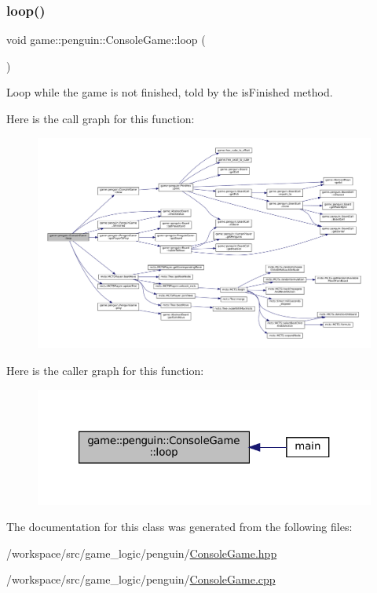 \subsubsection{\texorpdfstring{loop()}{loop()}}
{\footnotesize\ttfamily void game\+::penguin\+::\+Console\+Game\+::loop (\begin{DoxyParamCaption}{ }\end{DoxyParamCaption})}



Loop while the game is not finished, told by the {\ttfamily is\+Finished} method. 

Here is the call graph for this function\+:
\nopagebreak
\begin{figure}[H]
\begin{center}
\leavevmode
\includegraphics[width=350pt]{classgame_1_1penguin_1_1_console_game_a56af132d8e3d16902fb46b7979d37eae_cgraph}
\end{center}
\end{figure}
Here is the caller graph for this function\+:
\nopagebreak
\begin{figure}[H]
\begin{center}
\leavevmode
\includegraphics[width=321pt]{classgame_1_1penguin_1_1_console_game_a56af132d8e3d16902fb46b7979d37eae_icgraph}
\end{center}
\end{figure}


The documentation for this class was generated from the following files\+:\begin{DoxyCompactItemize}
\item 
/workspace/src/game\+\_\+logic/penguin/\hyperlink{penguin_2_console_game_8hpp}{Console\+Game.\+hpp}\item 
/workspace/src/game\+\_\+logic/penguin/\hyperlink{penguin_2_console_game_8cpp}{Console\+Game.\+cpp}\end{DoxyCompactItemize}
